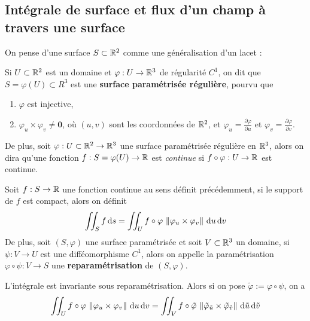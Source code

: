 \subsection{Intégrale de surface et flux d'un champ à travers une surface}
On pense d'une surface $S \subset \mathbb{R}^2$ comme une généralisation d'un lacet : 
\begin{definition} \label{def: Surface paramétrisée}
	Si $U \subset \mathbb{R}^2$ est un domaine et $\varphi : U \to \mathbb{R}^3$ de régularité $C^1$, on dit que $ S = \varphi(U) \subset R^3$ est une \textbf{surface paramétrisée régulière}, pourvu que
	\begin{enumerate}
		\item $\varphi$ est injective,
		\item $\varphi_u \times \varphi_v \neq \bm 0$, où $(u,v)$ sont les coordonnées de $\mathbb{R}^2$, et $\varphi_u = \frac{\partial \varphi}{\partial u}$ et $\varphi_v = \frac{\partial \varphi}{\partial v}$.
	\end{enumerate}
	De plus, soit $\varphi : U \subset \mathbb{R}^2 \to \mathbb{R}^3$ une surface paramétrisée régulière en $\mathbb{R}^3$, alors on dira qu'une fonction $f : S = \varphi(U) \to \mathbb{R}$ est \emph{continue} si $f \circ \varphi : U \to \mathbb{R}$ est continue. 
\end{definition}

\begin{definition}
	Soit $f : S \to \mathbb{R}$ une fonction continue au sens définit précédemment, si le support de $f$ est compact, alors on définit
	\[
	\iint_S f  \, \mathrm d s = \iint_U f \circ \varphi \, \left\| \varphi_u \times \varphi_v \right\| \, \mathrm du \, \mathrm dv
	\]
	De plus, soit $(S, \varphi)$ une surface paramétrisée et soit $V \subset \mathbb{R}^3$ un domaine, si $\psi : V \to U$ est une difféomorphisme $C^1$, alors on appelle la paramétrisation $\varphi \circ \psi : V \to S$ une \textbf{reparamétrisation} de $(S, \varphi)$.
\end{definition}

\begin{lemme}
	L'intégrale est invariante sous reparamétrisation. Alors si on pose $\tilde \varphi := \varphi \circ \psi$, on a 
	\[
	\iint_U f \circ \varphi \, \left\| \varphi_u \times \varphi_v  \right\| \, \mathrm du \, \mathrm dv =  \iint_V f \circ \tilde \varphi \, \left\| \tilde \varphi_{\tilde u} \times \tilde \varphi_{\tilde v}  \right\| \, \mathrm d \tilde u \, \mathrm d \tilde v
	\]
\end{lemme}


